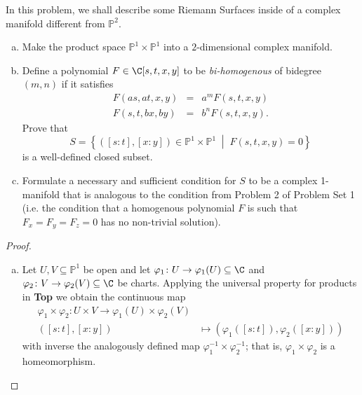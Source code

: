 \documentclass[10pt]{amsart}
\begin{document}
\begin{thm}
  In this problem, we shall describe some Riemann Surfaces inside of a complex manifold different from $\mathbb{P}^2$.
  \begin{enumerate}[(a)]
  \item
    Make the product space $\mathbb{P}^1 \times \mathbb{P}^1$ into a $2$-dimensional complex manifold.
  \item
    Define a polynomial $F \in \C[s,t,x,y]$ to be {\it bi-homogenous} of bidegree $(m,n)$ if it satisfies
    \begin{eqnarray*}
      F(as, at, x, y) &=& a^mF(s,t,x,y)\\
      F(s,t,bx,by) &=& b^nF(s,t,x,y).
    \end{eqnarray*}
    Prove that
    $$S = \left\{([s : t], [x : y]) \in \mathbb{P}^1 \times \mathbb{P}^1 \;\middle\vert\; F(s,t,x,y) = 0\right\}$$
    is a well-defined closed subset.
  \item
    Formulate a necessary and sufficient condition for $S$ to be a complex 1-manifold that is analogous to the condition from Problem 2 of Problem Set 1 
    (i.e. the condition that a homogenous polynomial $F$ is such that $F_x = F_y = F_z = 0$ has no non-trivial solution).
  \end{enumerate}
  
  \begin{proof}
    \begin{enumerate}[(a)]
    \item
      Let $U, V \subseteq \mathbb{P}^1$ be open and let $\varphi_1 \colon U \rightarrow \varphi_1(U) \subseteq \C$ and $\varphi_2 \colon V \rightarrow \varphi_2(V) \subseteq \C$ be charts.
      Applying the universal property for products in {\bf Top} we obtain the continuous map
      \begin{align*}
        \varphi_1 \times \varphi_2 \colon U \times V \rightarrow \varphi_1(U) \times \varphi_2(V)\\
        \left([s : t], [x : y]\right) &\mapsto \left(\varphi_1\left([s:t]\right), \varphi_2\left([x : y]\right)\right)
      \end{align*}
      with inverse the analogously defined map $\varphi_{1}^{-1} \times \varphi_{2}^{-1}$; that is, $\varphi_1 \times \varphi_2$ is a homeomorphism.
      

\end{enumerate}
\end{proof}
\end{thm}
\end{document}
